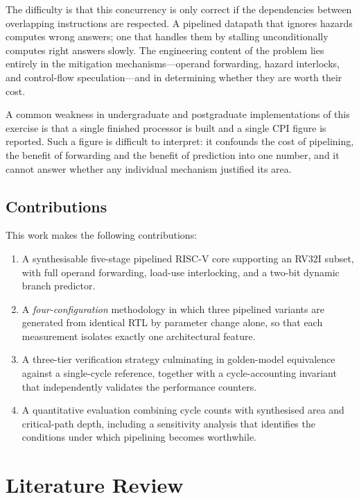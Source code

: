 \documentclass[conference]{IEEEtran}
\begin{document}
The difficulty is that this concurrency is only correct if the dependencies
between overlapping instructions are respected. A pipelined datapath that
ignores hazards computes wrong answers; one that handles them by stalling
unconditionally computes right answers slowly. The engineering content of
the problem lies entirely in the mitigation mechanisms---operand
forwarding, hazard interlocks, and control-flow speculation---and in
determining whether they are worth their cost.

A common weakness in undergraduate and postgraduate implementations of
this exercise is that a single finished processor is built and a single
CPI figure is reported. Such a figure is difficult to interpret: it
confounds the cost of pipelining, the benefit of forwarding and the
benefit of prediction into one number, and it cannot answer whether any
individual mechanism justified its area.

\subsection{Contributions}

This work makes the following contributions:

\begin{enumerate}
\item A synthesisable five-stage pipelined RISC-V core supporting an RV32I
      subset, with full operand forwarding, load-use interlocking, and a
      two-bit dynamic branch predictor.
\item A \emph{four-configuration} methodology in which three pipelined
      variants are generated from identical RTL by parameter change alone,
      so that each measurement isolates exactly one architectural feature.
\item A three-tier verification strategy culminating in golden-model
      equivalence against a single-cycle reference, together with a
      cycle-accounting invariant that independently validates the
      performance counters.
\item A quantitative evaluation combining cycle counts with synthesised
      area and critical-path depth, including a sensitivity analysis that
      identifies the conditions under which pipelining becomes
      worthwhile.
\end{enumerate}

\section{Literature Review}
\end{document}
